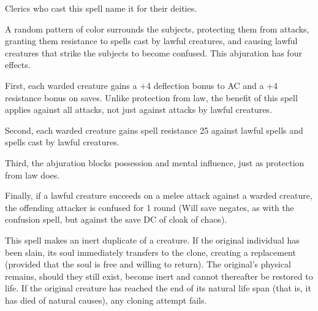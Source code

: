 \begin{multicols}{2}
\begin{small}
\smallskip\noindent Clerics who cast this spell name it for their deities.


\noindent A random pattern of color surrounds the subjects, protecting them from attacks, granting them resistance to spells cast by lawful creatures, and causing lawful creatures that strike the subjects to become confused. This abjuration has four effects.

\smallskip\noindent First, each warded creature gains a +4 deflection bonus to AC and a +4 resistance bonus on saves. Unlike protection from law, the benefit of this spell applies against all attacks, not just against attacks by lawful creatures.

\smallskip\noindent Second, each warded creature gains spell resistance 25 against lawful spells and spells cast by lawful creatures.

\smallskip\noindent Third, the abjuration blocks possession and mental influence, just as protection from law does.

\smallskip\noindent Finally, if a lawful creature succeeds on a melee attack against a warded creature, the offending attacker is confused for 1 round (Will save negates, as with the confusion spell, but against the save DC of cloak of chaos).


\noindent This spell makes an inert duplicate of a creature. If the original individual has been slain, its soul immediately transfers to the clone, creating a replacement (provided that the soul is free and willing to return). The original's physical remains, should they still exist, become inert and cannot thereafter be restored to life. If the original creature has reached the end of its natural life span (that is, it has died of natural causes), any cloning attempt fails.


\end{small}
\end{multicols}
